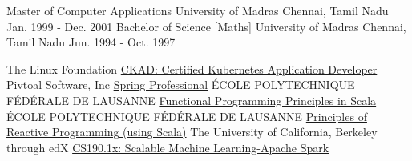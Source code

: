 \begin{cventries}
  \cventry
    {Master of Computer Applications}
    {University of Madras}
    {Chennai, Tamil Nadu}
    {Jan. 1999 - Dec. 2001}
    {      
    }
  \cventry
  {Bachelor of Science [Maths]}
  {University of Madras}
  {Chennai, Tamil Nadu}
  {Jun. 1994 - Oct. 1997}
  {
  }
\end{cventries}
\begin{cventries}
  \cventry
    {The Linux Foundation}
    {\href{https://www.credly.com/badges/1970a882-de77-4c30-9704-88b4a052ecff/linked_in_profile}{CKAD: Certified Kubernetes Application Developer}}
    {}{}{}
  \cventry
    {Pivtoal Software, Inc}
    {\href{https://bcert.me/bc/html/show-badge.html?b=gfcjzxzu}{Spring Professional}}
    {}{}{}
  \cventry
    {ÉCOLE POLYTECHNIQUE FÉDÉRALE DE LAUSANNE}
    {\href{https://www.coursera.org/account/accomplishments/certificate/MVD9BHZ3V6}{Functional Programming Principles in Scala}}
    {}{}{}
  \cventry
    {ÉCOLE POLYTECHNIQUE FÉDÉRALE DE LAUSANNE}
    {\href{https://www.coursera.org/account/accomplishments/verify/USHJQZYKSQ}{Principles of Reactive Programming (using Scala)}}
    {}{}{}
  \cventry
    {The University of California, Berkeley through edX}
    {\href{https://verify.edx.org/cert/92169a42642b43e9afe117dd761e6c4f}{CS190.1x: Scalable Machine Learning-Apache Spark}}
    {}{}{}
\end{cventries}